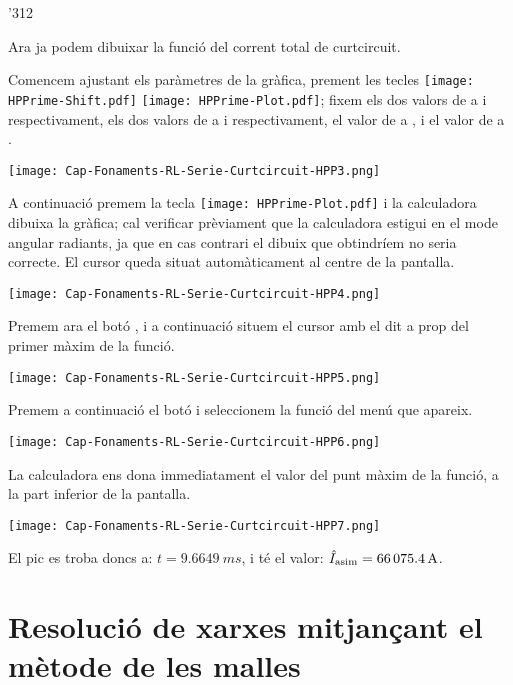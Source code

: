 \begin{exemple}
\begin{dingautolist}{'312}
        \item Ara ja podem dibuixar la funció del corrent total de curtcircuit.

            Comencem ajustant els paràmetres de la gràfica, prement les tecles \texttt{[image: HPPrime-Shift.pdf]} \texttt{[image: HPPrime-Plot.pdf]}; fixem els dos valors de  a  i  respectivament, els dos valors de  a  i  respectivament, el valor de  a , i el valor de  a .

            \texttt{[image: Cap-Fonaments-RL-Serie-Curtcircuit-HPP3.png]}
            \break

        \item A continuació premem la tecla \texttt{[image: HPPrime-Plot.pdf]} i la calculadora dibuixa la gràfica; cal verificar prèviament que la calculadora estigui en el mode angular radiants, ja que en cas contrari el dibuix que obtindríem no seria correcte. El cursor queda situat automàticament al centre de la pantalla.

            \texttt{[image: Cap-Fonaments-RL-Serie-Curtcircuit-HPP4.png]}

        \item Premem ara el botó , i a continuació situem el cursor amb el dit a prop del primer màxim de la funció.

            \texttt{[image: Cap-Fonaments-RL-Serie-Curtcircuit-HPP5.png]}

        \item Premem a continuació el botó  i seleccionem la funció  del menú que apareix.

            \texttt{[image: Cap-Fonaments-RL-Serie-Curtcircuit-HPP6.png]}

        \item La calculadora ens dona immediatament el valor del punt màxim de la funció, a la part inferior de la pantalla.

            \texttt{[image: Cap-Fonaments-RL-Serie-Curtcircuit-HPP7.png]}

            El pic es troba doncs a: $t=\SI{9,6649}{ms}$, i té el valor:  $\hat{I}_\mathrm{asim}=\SI{66075,4}{A}$.
    \end{dingautolist}

\end{exemple}


\section{Resolució de xarxes mitjançant el mètode de les malles}\label{sec:metode-malles}

